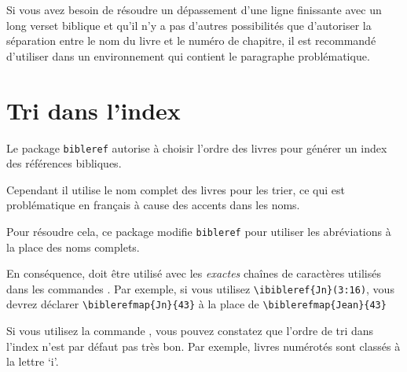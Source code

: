 \documentclass{ltxdoc}
\begin{document}
Si vous avez besoin de résoudre un dépassement d'une ligne finissante avec un long verset biblique et qu'il n'y a pas d'autres possibilités que d'autoriser la séparation entre le nom du livre et le numéro de chapitre, il est recommandé d'utiliser  dans un environnement qui contient le paragraphe problématique.

\section{Tri dans l'index}
Le package \verb|bibleref| autorise à choisir l'ordre des livres pour générer un index des références bibliques.

Cependant il utilise le nom complet des livres pour les trier, ce qui est problématique en français à cause des accents dans les noms.

Pour résoudre cela, ce package modifie \verb|bibleref| pour utiliser les abréviations à la place des noms complets.
 
En conséquence,  doit être utilisé avec les \emph{exactes} chaînes de caractères utilisés dans les commandes . Par exemple, si vous utilisez \verb|\ibibleref{Jn}(3:16)|, vous devrez déclarer \verb|\biblerefmap{Jn}{43}| à la place de \verb|\biblerefmap{Jean}{43}|


 Si vous utilisez la commande , vous pouvez constatez que l'ordre de tri dans l'index n'est par défaut pas très bon. Par exemple, livres numérotés sont classés à la lettre `i'. 
\end{document}
